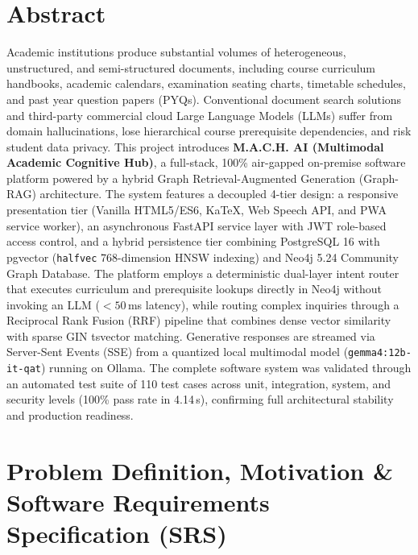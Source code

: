 \documentclass[11pt, a4paper]{article}
\begin{document}
\section{Abstract}
\noindent
Academic institutions produce substantial volumes of heterogeneous, unstructured, and semi-structured documents, including course curriculum handbooks, academic calendars, examination seating charts, timetable schedules, and past year question papers (PYQs). Conventional document search solutions and third-party commercial cloud Large Language Models (LLMs) suffer from domain hallucinations, lose hierarchical course prerequisite dependencies, and risk student data privacy. This project introduces \textbf{M.A.C.H. AI (Multimodal Academic Cognitive Hub)}, a full-stack, 100\% air-gapped on-premise software platform powered by a hybrid Graph Retrieval-Augmented Generation (Graph-RAG) architecture. The system features a decoupled 4-tier design: a responsive presentation tier (Vanilla HTML5/ES6, KaTeX, Web Speech API, and PWA service worker), an asynchronous FastAPI service layer with JWT role-based access control, and a hybrid persistence tier combining PostgreSQL 16 with pgvector (\texttt{halfvec} 768-dimension HNSW indexing) and Neo4j 5.24 Community Graph Database. The platform employs a deterministic dual-layer intent router that executes curriculum and prerequisite lookups directly in Neo4j without invoking an LLM ($<50$\,ms latency), while routing complex inquiries through a Reciprocal Rank Fusion (RRF) pipeline that combines dense vector similarity with sparse GIN tsvector matching. Generative responses are streamed via Server-Sent Events (SSE) from a quantized local multimodal model (\texttt{gemma4:12b-it-qat}) running on Ollama. The complete software system was validated through an automated test suite of 110 test cases across unit, integration, system, and security levels (100\% pass rate in 4.14\,s), confirming full architectural stability and production readiness.

\section{Problem Definition, Motivation \& Software Requirements Specification (SRS)}
\end{document}
